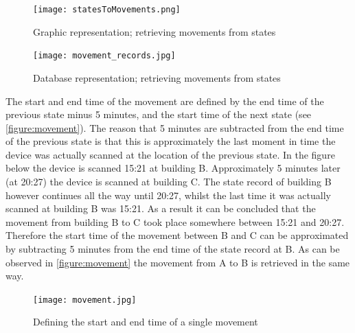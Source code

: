 \begin{figure}[H]
\centering
\texttt{[image: statesToMovements.png]}
\captionsetup{justification=centering}
\caption{Graphic representation; retrieving movements from states}
\label{figure:statesToMovements}
\end{figure}

\begin{figure}[H]
\centering
\texttt{[image: movement\_records.jpg]}
\captionsetup{justification=centering}
\caption{Database representation; retrieving movements from states}
\label{figure:movementrecs}
\end{figure}

The start and end time of the movement are defined by the end time of the previous state minus 5 minutes, and the start time of the next state (see \autoref{figure:movement}). The reason that 5 minutes are subtracted from the end time of the previous state is that this is approximately the last moment in time the device was actually scanned at the location of the previous state. In the figure below the device is scanned 15:21 at building B. Approximately 5 minutes later (at 20:27) the device is scanned at building C. The state record of building B however continues all the way until 20:27, whilst the last time it was actually scanned at building B was 15:21. As a result it can be concluded that the movement from building B to C took place somewhere between 15:21 and 20:27. Therefore the start time of the movement between B and C can be approximated by subtracting 5 minutes from the end time of the state record at B. As can be observed in \autoref{figure:movement} the movement from A to B is retrieved in the same way.

\begin{figure}[H]
\centering
\texttt{[image: movement.jpg]}
\captionsetup{justification=centering}
\caption{Defining the start and end time of a single movement}
\label{figure:movement}
\end{figure}


